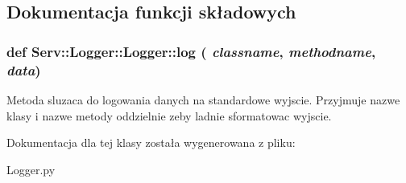 \subsection{Dokumentacja funkcji składowych}
\hypertarget{class_serv_1_1_logger_1_1_logger_a03728c5f5817396e373bde7861b69d69}{
\subsubsection[{log}]{\setlength{\rightskip}{0pt plus 5cm}def {\bf Serv::Logger::Logger::log} ( {\em classname}, \/   {\em methodname}, \/   {\em data})}}
\label{class_serv_1_1_logger_1_1_logger_a03728c5f5817396e373bde7861b69d69}
\begin{DoxyVerb}Metoda sluzaca do logowania danych na standardowe wyjscie.
Przyjmuje nazwe klasy i nazwe metody oddzielnie zeby ladnie sformatowac wyjscie.
\end{DoxyVerb}
 

Dokumentacja dla tej klasy została wygenerowana z pliku:\begin{DoxyCompactItemize}
\item 
Logger.py\end{DoxyCompactItemize}

